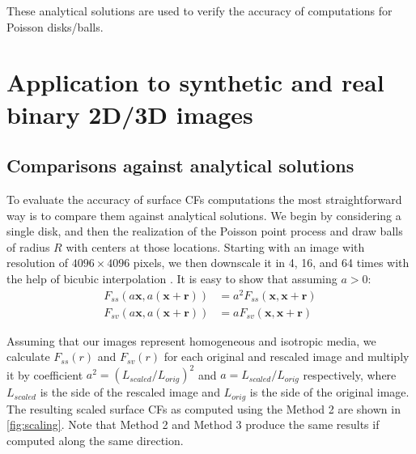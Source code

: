 \documentclass[reprint,amsmath,amssymb,aps,pre]{revtex4-1}
\begin{document}
These analytical solutions are used to verify the accuracy of computations for
Poisson disks/balls.

\section{Application to synthetic and real binary 2D/3D images}
\label{sec:results}
\subsection{Comparisons against analytical solutions}
\label{sec:comparison}
To evaluate the accuracy of surface CFs computations the most straightforward
way is to compare them against analytical solutions. We begin by considering a
single disk, and then the realization of the Poisson point process and draw
balls of radius $R$ with centers at those locations. Starting with an image
with resolution of $4096 \times 4096$ pixels, we then downscale it in 4, 16, and
64 times with the help of bicubic interpolation \cite{mexicans}. It is easy to
show that assuming $a > 0$:
\begin{align*}
  F_{ss}(a \mathbf{x}, a(\mathbf{x} + \mathbf{r})) &= a^2 F_{ss}(\mathbf{x},
  \mathbf{x} + \mathbf{r}) \\
  F_{sv}(a \mathbf{x}, a(\mathbf{x} + \mathbf{r})) &= a F_{sv}(\mathbf{x},
  \mathbf{x} + \mathbf{r})
\end{align*}

Assuming that our images represent homogeneous and isotropic media, we calculate
$F_{ss}(r)$ and $F_{sv}(r)$ for each original and rescaled image and multiply it
by coefficient $a^2 = (L_{scaled}/L_{orig})^2$ and $a = L_{scaled}/L_{orig}$
respectively, where $L_{scaled}$ is the side of the rescaled image and
$L_{orig}$ is the side of the original image. The resulting scaled surface CFs
as computed using the Method 2 are shown in \cref{fig:scaling}. Note that
Method 2 and Method 3 produce the same results if computed along the same
direction.
\end{document}
